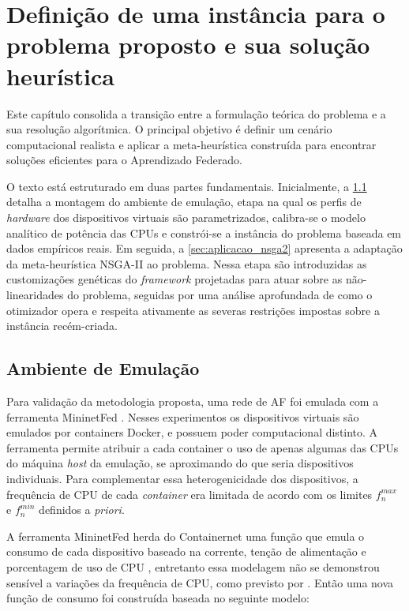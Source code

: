 \chapter{Definição de uma instância para o problema proposto e sua solução heurística}
\label{ch:sol_heuristica}

Este capítulo consolida a transição entre a formulação teórica do problema e a sua resolução algorítmica. O principal objetivo é definir um cenário computacional realista e aplicar a meta-heurística construída para encontrar soluções eficientes para o Aprendizado Federado. 

O texto está estruturado em duas partes fundamentais. Inicialmente, a \cref{subsec:abiente_emulacao} detalha a montagem do ambiente de emulação, etapa na qual os perfis de \textit{hardware} dos dispositivos virtuais são parametrizados, calibra-se o modelo analítico de potência das CPUs e constrói-se a instância do problema baseada em dados empíricos reais. Em seguida, a \cref{sec:aplicacao_nsga2} apresenta a adaptação da meta-heurística NSGA-II ao problema. Nessa etapa são introduzidas as customizações genéticas do \textit{framework} projetadas para atuar sobre as não-linearidades do problema, seguidas por uma análise aprofundada de como o otimizador opera e respeita ativamente as severas restrições impostas sobre a instância recém-criada.

\section{Ambiente de Emulação}
\label{subsec:abiente_emulacao}

Para validação da metodologia proposta, uma rede de AF foi emulada com a ferramenta MininetFed \cite{mininetfed}. Nesses experimentos os dispositivos virtuais são emulados por containers Docker, e possuem poder computacional distinto. A ferramenta permite atribuir a cada container o uso de apenas algumas das CPUs do máquina \textit{host} da emulação, se aproximando do que seria dispositivos individuais. Para complementar essa heterogenicidade dos dispositivos, a frequência de CPU de cada \textit{container} era limitada de acordo com os limites $f_n^{max}$ e $f_n^{min}$ definidos a \textit{priori}. 

A ferramenta MininetFed herda do Containernet uma função que emula o consumo de cada dispositivo baseado na corrente, tenção de alimentação e porcentagem de uso de CPU \cite{johann:sbrc}, entretanto essa modelagem não se demonstrou sensível a variações da frequência de CPU, como previsto por . Então uma nova função de consumo foi construída baseada no seguinte modelo: 


